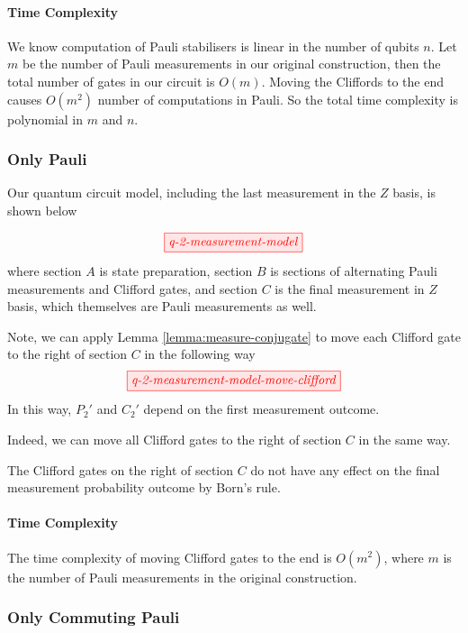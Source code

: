 \paragraph{Time Complexity}

We know computation of Pauli stabilisers is linear in the number of qubits $n$. 
Let $m$ be the number of Pauli measurements in our original construction, then the total number of gates in our circuit is $O(m)$.
Moving the Cliffords to the end causes $O(m^2)$ number of computations in Pauli.
So the total time complexity is polynomial in $m$ and $n$.

\subsubsection{Only Pauli}

Our quantum circuit model, including the last measurement in the $Z$ basis, is shown below 

\begin{equation}
	\tikzfig{q-2-measurement-model}
\end{equation}
where section $A$ is state preparation, section $B$ is sections of alternating Pauli measurements and Clifford gates, and section $C$ is the final measurement in $Z$ basis, which themselves are Pauli measurements as well.

Note, we can apply Lemma \ref{lemma:measure-conjugate} to move each Clifford gate to the right of section $C$ in the following way 
$$
	\tikzfig{q-2-measurement-model-move-clifford}
$$
In this way, $P_2'$ and $C_2'$ depend on the first measurement outcome.

Indeed, we can move all Clifford gates to the right of section $C$ in the same way.

The Clifford gates on the right of section $C$ do not have any effect on the final measurement probability outcome by Born's rule.

\paragraph{Time Complexity}

The time complexity of moving Clifford gates to the end is $O(m^2)$, where $m$ is the number of Pauli measurements in the original construction.

\subsubsection{Only Commuting Pauli}

